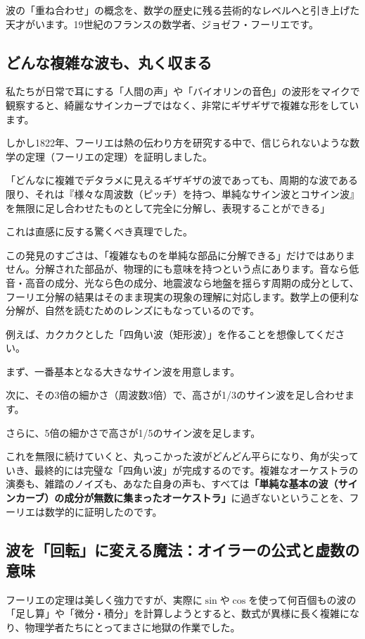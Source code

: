波の「重ね合わせ」の概念を、数学の歴史に残る芸術的なレベルへと引き上げた天才がいます。19世紀のフランスの数学者、ジョゼフ・フーリエです。

\subsection{どんな複雑な波も、丸く収まる}

私たちが日常で耳にする「人間の声」や「バイオリンの音色」の波形をマイクで観察すると、綺麗なサインカーブではなく、非常にギザギザで複雑な形をしています。

しかし1822年、フーリエは熱の伝わり方を研究する中で、信じられないような数学の定理（フーリエの定理）を証明しました。

「どんなに複雑でデタラメに見えるギザギザの波であっても、周期的な波である限り、それは『様々な周波数（ピッチ）を持つ、単純なサイン波とコサイン波』を無限に足し合わせたものとして完全に分解し、表現することができる」

これは直感に反する驚くべき真理でした。

この発見のすごさは、「複雑なものを単純な部品に分解できる」だけではありません。分解された部品が、物理的にも意味を持つという点にあります。音なら低音・高音の成分、光なら色の成分、地震波なら地盤を揺らす周期の成分として、フーリエ分解の結果はそのまま現実の現象の理解に対応します。数学上の便利な分解が、自然を読むためのレンズにもなっているのです。

例えば、カクカクとした「四角い波（矩形波）」を作ることを想像してください。

まず、一番基本となる大きなサイン波を用意します。

次に、その3倍の細かさ（周波数3倍）で、高さが1/3のサイン波を足し合わせます。

さらに、5倍の細かさで高さが1/5のサイン波を足します。

これを無限に続けていくと、丸っこかった波がどんどん平らになり、角が尖っていき、最終的には完璧な「四角い波」が完成するのです。複雑なオーケストラの演奏も、雑踏のノイズも、あなた自身の声も、すべては\textbf{「単純な基本の波（サインカーブ）の成分が無数に集まったオーケストラ」}に過ぎないということを、フーリエは数学的に証明したのです。

\subsection{波を「回転」に変える魔法：オイラーの公式と虚数の意味}

フーリエの定理は美しく強力ですが、実際に\(\sin\)や\(\cos\)を使って何百個もの波の「足し算」や「微分・積分」を計算しようとすると、数式が異様に長く複雑になり、物理学者たちにとってまさに地獄の作業でした。

